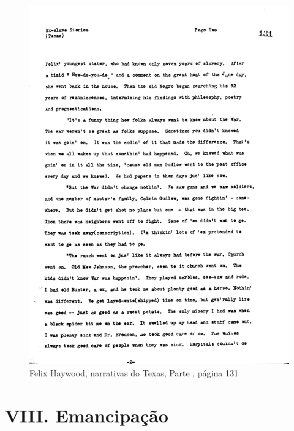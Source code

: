 \begin{absolutelynopagebreak}
\begin{vplace}
\begin{figure}[H]
\begin{adjustwidth}{-1.6cm}{}
  \vspace*{-2cm}
  \includegraphics[width=133mm]{./imgs/Cap8.jpg}  
\end{adjustwidth}
  \caption{Felix Haywood, narrativas do Texas, Parte , página 131}
\end{figure}
\end{vplace}

\end{absolutelynopagebreak}

\chapter*{VIII. Emancipação}

